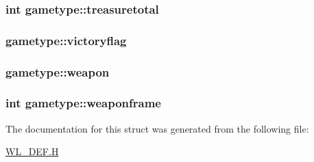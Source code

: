 \label{structgametype_a40b6ddfb632a2553862e3fcf48ec5596}
\hypertarget{structgametype_aa07c90bd0c0af5fc42daf21fb6387629}{
\subsubsection[{treasuretotal}]{\setlength{\rightskip}{0pt plus 5cm}int {\bf gametype::treasuretotal}}}
\label{structgametype_aa07c90bd0c0af5fc42daf21fb6387629}
\hypertarget{structgametype_a5bf71eaa736452af0bd28cbce8ef4ddd}{
\subsubsection[{victoryflag}]{ {\bf gametype::victoryflag}}}
\label{structgametype_a5bf71eaa736452af0bd28cbce8ef4ddd}
\hypertarget{structgametype_aad819eefa79c9760a6a51a4d877d72e2}{
\subsubsection[{weapon}]{ {\bf gametype::weapon}}}
\label{structgametype_aad819eefa79c9760a6a51a4d877d72e2}
\hypertarget{structgametype_a880ba0dbee36a67c4f1144a3c1e9b2d8}{
\subsubsection[{weaponframe}]{\setlength{\rightskip}{0pt plus 5cm}int {\bf gametype::weaponframe}}}
\label{structgametype_a880ba0dbee36a67c4f1144a3c1e9b2d8}


The documentation for this struct was generated from the following file:\begin{DoxyCompactItemize}
\item 
\hyperlink{WL__DEF_8H}{WL\_\-DEF.H}\end{DoxyCompactItemize}
